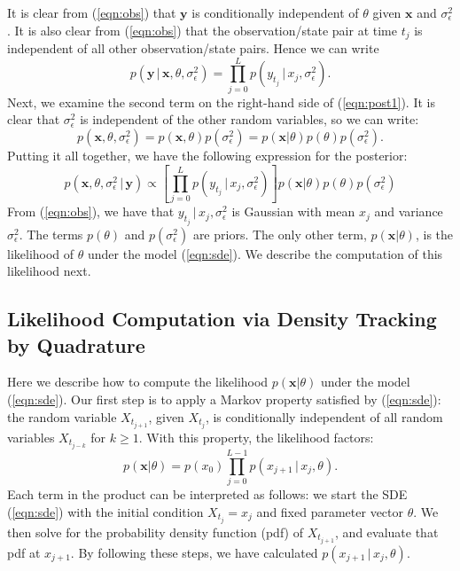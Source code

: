 \documentclass[wcp]{jmlr}
\begin{document}
It is clear from (\ref{eqn:obs}) that $\mathbf{y}$ is conditionally
independent of $\theta$ given $\mathbf{x}$ and $\sigma_\epsilon^2$.
It is also clear from (\ref{eqn:obs}) that the observation/state pair
at time $t_j$ is independent of all other observation/state pairs.
Hence we can write
\begin{equation}
\label{eqn:obsstate}
p( \mathbf{y} \, | \, \mathbf{x}, \theta, \sigma_\epsilon^2 )
= \prod_{j=0}^L p( y_{t_j} \, | \, x_j, \sigma_\epsilon^2 ).
\end{equation}
Next, we examine the second term on the right-hand side of
(\ref{eqn:post1}).  It is clear that $\sigma_\epsilon^2$ is independent
of the other random variables, so we can write:
\begin{equation}
\label{eqn:secondterm}
p(\mathbf{x}, \theta, \sigma_\epsilon^2) = p(\mathbf{x}, \theta)
p(\sigma_\epsilon^2) = p( \mathbf{x} | \theta ) p(\theta)
p(\sigma_\epsilon^2).
\end{equation}
Putting it all together, we have the following expression for the
posterior:
\begin{equation}
\label{eqn:post2}
p(\mathbf{x}, \theta, \sigma_\epsilon^2 \, | \, \mathbf{y}) 
\propto \left[ \prod_{j=0}^L p( y_{t_j} \, | \, x_j,
  \sigma_\epsilon^2 ) \right] p( \mathbf{x} | \theta ) p(\theta)
p(\sigma_\epsilon^2)
\end{equation}
From (\ref{eqn:obs}), we have that $y_{t_j} \, | \, x_j,
\sigma_\epsilon^2$ is Gaussian with mean $x_j$ and variance
$\sigma_\epsilon^2$.  The terms $p(\theta)$ and $p(\sigma_\epsilon^2)$
are priors.  The only other term, $p( \mathbf{x} | \theta )$, is the 
likelihood of $\theta$ under the model (\ref{eqn:sde}).  We describe
the computation of this likelihood next.

\subsection{Likelihood Computation via Density Tracking by Quadrature}
\label{sect:likelihood}
Here we describe how to compute the likelihood $p(\mathbf{x} |
\theta)$ under the model (\ref{eqn:sde}).  Our first step is to apply
a Markov property satisfied by (\ref{eqn:sde}): the random variable
$X_{t_{j+1}}$, given $X_{t_j}$, is conditionally independent of
all random variables $X_{t_{j-k}}$ for $k \geq 1$.  With this
property, the likelihood factors:
\begin{equation}
\label{eqn:markov}
p(\mathbf{x} | \theta) = p(x_0) \prod_{j=0}^{L-1} p(x_{j+1} \, | \,
x_j, \theta).
\end{equation}
Each term in the product can be interpreted as follows: we
start the SDE (\ref{eqn:sde}) with the initial condition $X_{t_j} =
x_j$ and fixed parameter vector $\theta$.  We then solve for the
probability density function (pdf) of $X_{t_{j+1}}$, and evaluate that
pdf at $x_{j+1}$.  By following these steps, we have calculated
$p(x_{j+1} \, | \, x_j, \theta)$.
\end{document}
